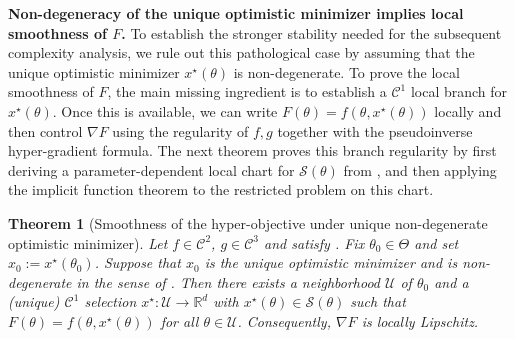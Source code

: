 \documentclass{article}
\theoremstyle{normaltheorem}
\newtheorem{theorem}{Theorem}[section]
\newcommand{\R}{\mathbb{R}}
\newcommand{\calS}{\mathcal{S}}
\begin{document}
\textbf{Non-degeneracy of the unique optimistic minimizer implies local smoothness of $F$.}
To establish the stronger stability needed for the subsequent complexity analysis, we rule out this pathological case by assuming that the unique optimistic minimizer $x^\star(\theta)$ is non-degenerate.
To prove the local smoothness of $F$, the main missing ingredient is to establish a $\mathcal C^1$ local branch for $x^\star(\theta)$.
Once this is available, we can write $F(\theta)=f(\theta,x^\star(\theta))$ locally and then control $\nabla F$ using the regularity of $f,g$ together with the pseudoinverse hyper-gradient formula.
The next theorem proves this branch regularity by first deriving a parameter-dependent local chart for \(\calS(\theta)\) from , and then applying the implicit function theorem to the restricted problem on this chart.
\begin{theorem}[Smoothness of the hyper-objective under unique non-degenerate optimistic minimizer]\label{thm_hyp_obj_diff}
Let $f \in \mathcal C^2$, $g \in \mathcal C^3$ and satisfy .
Fix $\theta_0\in\Theta$ and set \(x_0:=x^\star(\theta_0)\). Suppose that \(x_0\) is the unique optimistic minimizer and is non-degenerate in the sense of .
Then there exists a neighborhood $\mathcal U$ of $\theta_0$ and a (unique) $\mathcal C^1$ selection
$x^\star:\mathcal U\to\R^d$ with $x^\star(\theta)\in\calS(\theta)$ such that $F(\theta)=f(\theta,x^\star(\theta))$ for all $\theta\in\mathcal U$.
Consequently, \(\nabla F\) is locally Lipschitz.
\end{theorem}
\end{document}
